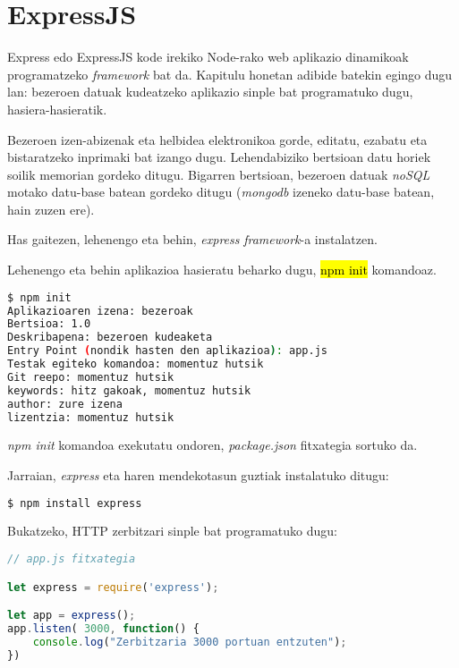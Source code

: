 \chapter{ExpressJS}

Express edo ExpressJS  kode irekiko Node-rako web aplikazio dinamikoak programatzeko \textit{framework} bat da. Kapitulu honetan adibide batekin egingo dugu lan: bezeroen datuak kudeatzeko aplikazio sinple bat programatuko dugu, hasiera-hasieratik.

Bezeroen izen-abizenak eta helbidea elektronikoa gorde, editatu, ezabatu eta bistaratzeko inprimaki bat izango dugu. Lehendabiziko bertsioan datu horiek soilik memorian gordeko ditugu. Bigarren bertsioan, bezeroen datuak \textit{noSQL} motako datu-base batean gordeko ditugu (\textit{mongodb} izeneko datu-base batean, hain zuzen ere).

Has gaitezen, lehenengo eta behin, \textit{express} \textit{framework}-a instalatzen.

Lehenengo eta behin aplikazioa hasieratu beharko dugu, \hl{npm init} komandoaz.


\begin{lstlisting}[language=Bash,numbers=none]
$ npm init
Aplikazioaren izena: bezeroak
Bertsioa: 1.0
Deskribapena: bezeroen kudeaketa
Entry Point (nondik hasten den aplikazioa): app.js
Testak egiteko komandoa: momentuz hutsik
Git reepo: momentuz hutsik
keywords: hitz gakoak, momentuz hutsik
author: zure izena
lizentzia: momentuz hutsik

\end{lstlisting}

\textit{npm init} komandoa exekutatu ondoren, \textit{package.json} fitxategia sortuko da.

Jarraian, \textit{express} eta haren mendekotasun guztiak instalatuko ditugu:

\begin{lstlisting}[language=Bash,numbers=none]
$ npm install express 
\end{lstlisting}

Bukatzeko, HTTP zerbitzari sinple bat programatuko dugu:

\begin{lstlisting}[language=JavaScript]
// app.js fitxategia

let express = require('express');

let app = express();
app.listen( 3000, function() {
	console.log("Zerbitzaria 3000 portuan entzuten");
})
\end{lstlisting}

